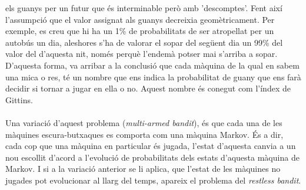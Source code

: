 els guanys per un futur que és interminable però amb 'descomptes'.
Fent així l'assumpció que el valor assignat als guanys decreixia
geomètricament. Per exemple, es creu que hi ha un 1\% de probabilitats de
ser atropellat per un autobús un dia, aleshores s'ha de valorar el sopar del
següent dia un 99\% del valor del d'aquesta nit, només perquè l'endemà potser mai
s'arriba a sopar. D'aquesta forma, va arribar a la conclusió que cada màquina
de la qual en sabem una mica o res, té un nombre que ens indica la probabilitat
de guany que ens farà decidir si tornar a jugar en ella o no. Aquest
nombre és conegut com l'índex de Gittins.\\\\
Una variació d'aquest problema (\textit{multi-armed bandit}), és que cada una de
les màquines escura-butxaques es comporta com una màquina Markov. És a dir,
cada cop que una màquina en particular és jugada, l'estat d'aquesta canvia
a un nou escollit d'acord a l'evolució de probabilitats dels estats d'aquesta màquina de Markov.
I si a la variació anterior se li aplica, que l'estat de les màquines no jugades
pot evolucionar al llarg del temps, apareix el problema del \textit{restless bandit}.
